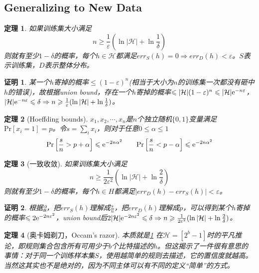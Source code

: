 \documentclass[8pt]{article}
\theoremstyle{compact}
\newtheorem{theorem}{定理}
\newtheorem{Proof}{证明}
\def\le{\leqslant}
\def\ge{\geqslant}
\def\Pr#1{\text{Pr}\left[{#1}\right]}
\begin{document}
\subsection{Generalizing to New Data}
\begin{theorem}
	如果训练集大小满足\begin{equation}
	n \ge \frac{1}{\varepsilon}(\ln |\mathcal H| + \ln \frac{1}{\delta})
	\end{equation}则就有至少$1 - \delta$的概率，每个$h \in \mathcal H$都满足$err_S(h) = 0 \Rightarrow err_D(h) < \varepsilon$。$S$表示训练集，$D$表示整体分布。
	\label{training}
\end{theorem}
\begin{Proof}
	某一个$h$寄掉的概率$\le (1 - \varepsilon)^n$(相当于大小为$n$的训练集一次都没有砸中$h$的错误)，故根据union bound，存在一个$h$寄掉的概率$\le |\mathcal H|(1 - \varepsilon)^n \le |\mathcal H|\text e^{-n\varepsilon}$，$|\mathcal H|\text e^{-n\varepsilon} \le \delta \Rightarrow n \ge \frac{1}{\varepsilon}(\ln |\mathcal H| + \ln \frac{1}{\delta})$。
\end{Proof}
\begin{theorem}[Hoeffding bounds]
	$x_1, x_2, \cdots, x_n$是$n$个独立随机$\{0, 1\}$变量满足$\Pr{x_i = 1} = p$。令$s = \sum_i x_i$，则对于任意$0 \le \alpha \le 1$
	\begin{equation}
	\Pr{\frac sn > p + \alpha} \le \text e^{-2n\alpha^2} \qquad \Pr{\frac sn < p - \alpha} \le \text e^{-2n\alpha^2}
	\end{equation}
	\label{Hoeffding}
\end{theorem}
\begin{theorem}[一致收敛]
	如果训练集大小满足\begin{equation}
	n \ge \frac{1}{2\varepsilon^2}(\ln|\mathcal H| + \ln\frac{2}{\delta})
	\end{equation}
	则就有至少$1 - \delta$的概率，每个$h \in H$都满足$|err_D(h) - err_S(h)| < \varepsilon$。
\end{theorem}
\begin{Proof}
	根据\cref{Hoeffding}，把$err_S(h)$理解成$\frac{s}{n}$，把$err_D(h)$理解成$p$，可以得到某个$h$寄掉的概率$\le 2\text e^{-2n\varepsilon^2}$，union bound后$2|\mathcal H|\text e^{-2n\varepsilon^2} \le \delta \Rightarrow n \ge \frac{1}{2\varepsilon^2}(\ln|\mathcal H| + \ln\frac{2}{\delta})$。
\end{Proof}
\begin{theorem}[奥卡姆剃刀，Occam's razor]
	本质就是\cref{training} 在$\mathcal H = [2^b-1]$时的平凡推论，即规则集合包含所有可用少于$b$个比特描述的$h$。但这揭示了一件很有意思的事情：对于同一个训练样本集$S$，使用越简单的规则去描述，它的置信度就越高。当然这其实也不是绝对的，因为不同主体可以有不同的定义“简单”的方式。
\end{theorem}
\end{document}
